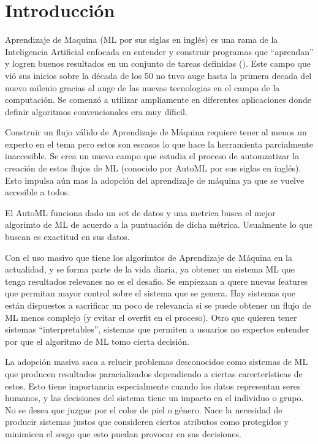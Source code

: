 
\chapter*{Introducción}\label{chapter:introduction}

Aprendizaje de Maquina (ML por sus siglas en ingl\'es) es una rama de la Inteligencia Artificial enfocada en entender y construir programas que ``aprendan'' y logren buenos resultados en un conjunto de tareas definidas (\cite{mitchell1990machine}). Este campo que vi\'o sus inicios sobre la d\'ecada de los 50 no tuvo auge hasta la primera decada del nuevo milenio gracias al auge de las nuevas tecnologias en el campo de la computaci\'on. Se comenz\'o a utilizar ampliamente en diferentes aplicaciones donde definir algoritmos convencionales era muy d\'ificil.

Construir un flujo v\'alido de Aprendizaje de M\'aquina requiere tener al menos un experto en el tema pero estos son escasos lo que hace la herramienta parcialmente inaccesible. Se crea un nuevo campo que estudia el proceso de automzatizar la creaci\'on de estos flujos de ML (conocido por AutoML por sus siglas en ingl\'es). Esto impulsa a\'un mas la adopci\'on del aprendizaje de m\'aquina ya que se vuelve accesible a todos.

El AutoML funciona dado un set de datos y una metrica busca el mejor algorimto de ML de acuerdo a la puntuaci\'on de dicha m\'etrica. Usualmente lo que buscan es exactitud en sus datos.

Con el uso masivo que tiene los algorimtos de Aprendizaje de M\'aquina en la actualidad, y se forma parte de la vida diaria, ya obtener un sistema ML que tenga resultados relevanes no es el desafio. Se empiezaan a quere nuevas features que permitan mayor control sobre el sistema que se genera. Hay sistemas que est\'an dispuestos a sacrificar un poco de relevancia si se puede obtener un flujo de ML menos complejo (y evitar el overfit en el proceso). Otro que quieren tener sistemas ``interpretables'', sistemas que permiten a usuarios no expertos entender por que el algoritmo de ML tomo cierta decisi\'on.

La adopci\'on masiva saca a relucir problemas desconocidos como sistemas de ML que producen resultados paracializados dependiendo a ciertas carecter\'isticas de estos. Esto tiene importancia especialmente cuando los datos representan seres humanos, y las decisiones del sistema tiene un impacto en el individuo o grupo. No se desea que juzgue por el color de piel o g\'enero. Nace la necesidad de producir sistemas justos que consideren ciertos atributos como protegidos y minimicen el sesgo que esto puedan provocar en sus decisiones.


